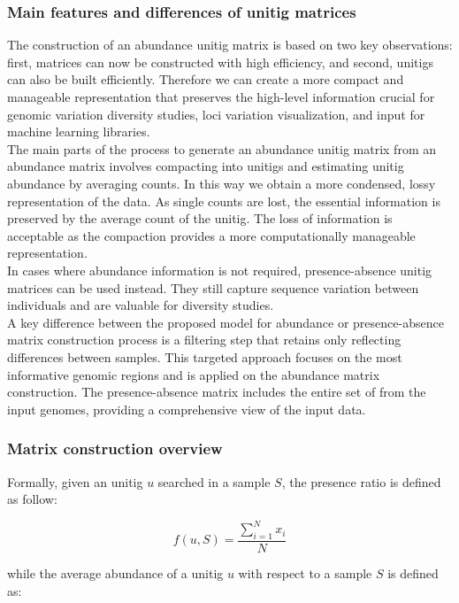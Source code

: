 \subsubsection{Main features and differences of unitig matrices}
The construction of an abundance unitig matrix is based on two key observations: first, \kmer matrices can now be constructed with high efficiency, and second, unitigs can also be built efficiently. Therefore we can create a more compact and manageable representation that preserves the high-level information crucial for genomic variation diversity studies, loci variation visualization, and input for machine learning libraries.\\
The main parts of the process to generate an abundance unitig matrix from an abundance \kmer matrix involves compacting \kmers into unitigs and estimating unitig abundance by averaging \kmer counts. In this way we obtain a more condensed, lossy representation of the data. As single \kmer counts are lost, the essential information is preserved by the average count of the unitig. The loss of information is acceptable as the compaction provides a more computationally manageable representation.\\
In cases where abundance information is not required, presence-absence unitig matrices can be used instead. They still capture sequence variation between individuals and are valuable for diversity studies.\\
A key difference between the proposed model for abundance or presence-absence matrix construction process is a filtering step that retains only \kmers reflecting differences between samples. This targeted approach focuses on the most informative genomic regions and is applied on the abundance matrix construction. The presence-absence matrix includes the entire set of \kmers from the input genomes, providing a comprehensive view of the input data.\\

\subsubsection{Matrix construction overview}
Formally, given an unitig $u$ searched in a sample $S$, the \kmer presence ratio is defined as follow:

\begin{equation}
	f(u, S) = \frac{\sum_{i=1}^{N}{x_i}}{N}
\end{equation}

while the average abundance of a unitig $u$ with respect to a sample $S$ is defined as:

